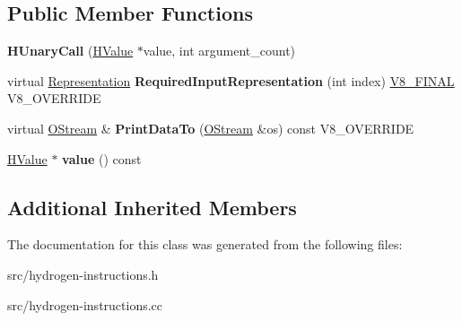 \subsection*{Public Member Functions}
\begin{DoxyCompactItemize}
\item 
\hypertarget{classv8_1_1internal_1_1_h_unary_call_a1ec7a4ef2ac15e9b37e5298e7ac0986b}{}{\bfseries H\+Unary\+Call} (\hyperlink{classv8_1_1internal_1_1_h_value}{H\+Value} $\ast$value, int argument\+\_\+count)\label{classv8_1_1internal_1_1_h_unary_call_a1ec7a4ef2ac15e9b37e5298e7ac0986b}

\item 
\hypertarget{classv8_1_1internal_1_1_h_unary_call_abf50896e7640a1ce82f0c94129e84c0e}{}virtual \hyperlink{classv8_1_1internal_1_1_representation}{Representation} {\bfseries Required\+Input\+Representation} (int index) \hyperlink{classv8_1_1internal_1_1_v8___f_i_n_a_l}{V8\+\_\+\+F\+I\+N\+A\+L} V8\+\_\+\+O\+V\+E\+R\+R\+I\+D\+E\label{classv8_1_1internal_1_1_h_unary_call_abf50896e7640a1ce82f0c94129e84c0e}

\item 
\hypertarget{classv8_1_1internal_1_1_h_unary_call_aceb8ec805560000701157e6fc3829b5b}{}virtual \hyperlink{classv8_1_1internal_1_1_o_stream}{O\+Stream} \& {\bfseries Print\+Data\+To} (\hyperlink{classv8_1_1internal_1_1_o_stream}{O\+Stream} \&os) const V8\+\_\+\+O\+V\+E\+R\+R\+I\+D\+E\label{classv8_1_1internal_1_1_h_unary_call_aceb8ec805560000701157e6fc3829b5b}

\item 
\hypertarget{classv8_1_1internal_1_1_h_unary_call_a3eb810291644e6c1f953ee144f7f7d9b}{}\hyperlink{classv8_1_1internal_1_1_h_value}{H\+Value} $\ast$ {\bfseries value} () const \label{classv8_1_1internal_1_1_h_unary_call_a3eb810291644e6c1f953ee144f7f7d9b}

\end{DoxyCompactItemize}
\subsection*{Additional Inherited Members}


The documentation for this class was generated from the following files\+:\begin{DoxyCompactItemize}
\item 
src/hydrogen-\/instructions.\+h\item 
src/hydrogen-\/instructions.\+cc\end{DoxyCompactItemize}
